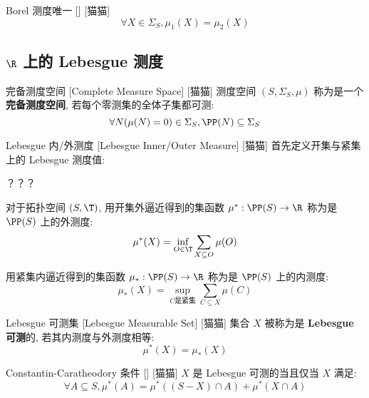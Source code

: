 \documentclass[UTF8]{ctexart}
\begin{document}
            \begin{thm}
                {Borel 测度唯一}
                []
                [猫猫]
                \[\forall X\in\Sigma_S, \mu_1(X)=\mu_2(X)\]
            \end{thm}
            
        \subsection{\(\R\) 上的 Lebesgue 测度} %
        
            \begin{dfn}
                {完备测度空间}
                [Complete Measure Space]
                [猫猫]
                测度空间 \((S,\Sigma_S,\mu)\) 称为是一个\textbf{完备测度空间}, 若每个零测集的全体子集都可测: 
                \[\forall N(\mu(N)=0)\in\Sigma_S, \PP(N)\subseteq\Sigma_S\]
            \end{dfn}
            
            \begin{dfn}
                {Lebesgue 内/外测度}
                [Lebesgue Inner/Outer Measure]
                [猫猫]
                首先定义开集与紧集上的 Lebesgue 测度值: 

                ？？？

                对于拓扑空间 \((S,\T)\), 用开集外逼近得到的集函数 \(\mu^*:\PP(S)\to\R\) 称为是 \(\PP(S)\) 上的外测度: 
                \[\mu^*(X)=\inf_{O\in\T}\sum_{X\subseteq O}\mu(O)\]

                用紧集内逼近得到的集函数 \(\mu_*:\PP(S)\to\R\) 称为是 \(\PP(S)\) 上的内测度: 
                \[\mu_*(X)=\sup_{C\text{是紧集}}\sum_{C\subseteq X}\mu(C)\]
            \end{dfn}
            
            \begin{dfn}
                {Lebesgue 可测集}
                [Lebesgue Measurable Set]
                [猫猫]
                集合 $X$ 被称为是 \textbf{Lebesgue 可测}的, 若其内测度与外测度相等: 
                \[\mu^*(X)=\mu_*(X)\]
            \end{dfn}
            
            \begin{ppt}
                {Constantin-Caratheodory 条件}
                []
                [猫猫]
                \(X\) 是 Lebesgue 可测的当且仅当 \(X\) 满足: 
                \[\forall A\subseteq S, \mu^*(A)=\mu^*((S-X)\cap A)+\mu^*(X\cap A)\]
            \end{ppt}
            
\end{document}
